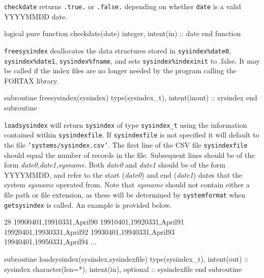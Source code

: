 \documentclass[11pt,thmsa,letter,ukenglish]{article}
\begin{document}
\noindent\texttt{checkdate} returns \texttt{.true.} or \texttt{.false.} depending on whether \texttt{date} is a valid YYYYMMDD date.

\begin{fortrancode}
logical pure function checkdate(date)
    integer, intent(in) :: date
end function
\end{fortrancode}

\noindent\texttt{freesysindex} deallocates the data structures stored in \texttt{sysindex\%date0}, \texttt{sysindex\%date1}, \texttt{sysindex\%fname}, and sets \texttt{sysindex\%indexinit} to {.false.} It may be called if the index files are no longer needed by the program calling the FORTAX library.

\begin{fortrancode}
subroutine freesysindex(sysindex)
    type(sysindex_t), intent(inout) :: sysindex
end subroutine
\end{fortrancode}

\noindent\texttt{loadsysindex} will return \texttt{sysindex} of type \texttt{sysindex\_t} using the information contained within \texttt{sysindexfile}. If \texttt{sysindexfile} is not specified it will default to the file \texttt{`systems/sysindex.csv'}. The first line of the CSV file \texttt{sysindexfile} should equal the number of records in the file. Subsequent lines should be of the form \emph{date0,date1,sysname}. Both \emph{date0} and \emph{date1} should be of the form YYYYMMDD, and refer to the start (\emph{date0}) and end (\emph{date1}) dates that the system \emph{sysname} operated from. Note that \emph{sysname} should not contain either a file path or file extension, as these will be determined by \texttt{systemformat} when \texttt{getsysindex} is called. An example is provided below.

\begin{csvcode}[title={Extract from \texttt{systems/sysindex.csv}},frame=lines]
28
19900401,19910331,April90
19910401,19920331,April91
19920401,19930331,April92
19930401,19940331,April93
19940401,19950331,April94
...
\end{csvcode}

\begin{fortrancode}
subroutine loadsysindex(sysindex,sysindexfile)
    type(sysindex_t), intent(out)          :: sysindex
    character(len=*), intent(in), optional :: sysindexfile
end subroutine
\end{fortrancode}
\end{document}
